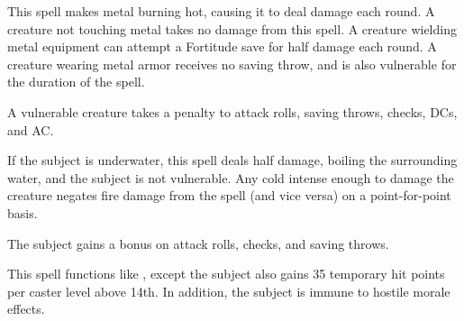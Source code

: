 \spellrng{\rngmed}
\begin{spelleffect}
  This spell makes metal burning hot, causing it to deal damage each round. A creature not touching metal takes no damage from this spell. A creature wielding metal equipment can attempt a Fortitude save for half damage each round. A creature wearing metal armor receives no saving throw, and is also vulnerable for the duration of the spell.
\end{spelleffect}
\begin{spellnotes}
A vulnerable creature takes a  penalty to attack rolls, saving throws, checks, DCs, and AC.

  If the subject is underwater, this spell deals half damage, boiling the surrounding water, and the subject is not vulnerable. Any cold intense enough to damage the creature negates fire damage from the spell (and vice versa) on a point-for-point basis.
\end{spellnotes}

\spellrng{\rngclose}
\begin{spelleffect}
  The subject gains a  bonus on attack rolls, checks, and saving throws. \bonusscalingdescription
\end{spelleffect}

\begin{spelleffect}
  This spell functions like , except the subject also gains 35 temporary hit points  per caster level above 14th. In addition, the subject is immune to hostile morale effects.
\end{spelleffect}

